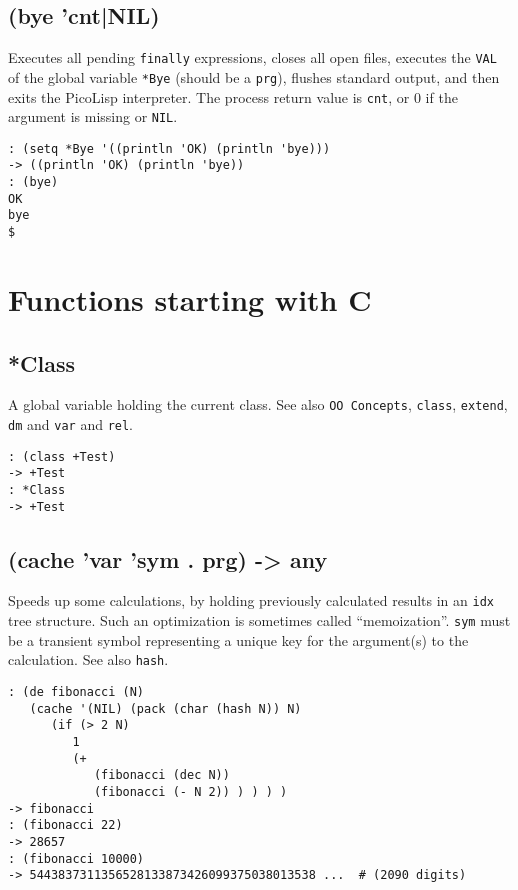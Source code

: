 { 
\section{(bye 'cnt|NIL)}
\label{sec-8-1-2-20}


Executes all pending \texttt{finally} expressions, closes all open files,
executes the \texttt{VAL} of the global variable \texttt{*Bye} (should be a \texttt{prg}),
flushes standard output, and then exits the PicoLisp interpreter. The
process return value is \texttt{cnt}, or 0 if the argument is missing or \texttt{NIL}.


\begin{verbatim}
: (setq *Bye '((println 'OK) (println 'bye)))
-> ((println 'OK) (println 'bye))
: (bye)
OK
bye
$
\end{verbatim}


\chapter{Functions starting with C}
\label{sec-8-1-3}


 
\section{*Class}
\label{sec-8-1-3-1}


A global variable holding the current class. See also \texttt{OO Concepts},
\texttt{class}, \texttt{extend}, \texttt{dm} and \texttt{var} and \texttt{rel}.


\begin{verbatim}
: (class +Test)
-> +Test
: *Class
-> +Test
\end{verbatim}

 
\section{(cache 'var 'sym . prg) -> any}
\label{sec-8-1-3-2}


Speeds up some calculations, by holding previously calculated results in
an \texttt{idx} tree structure. Such an optimization is sometimes called
``memoization''. \texttt{sym} must be a transient symbol representing a unique
key for the argument(s) to the calculation. See also \texttt{hash}.


\begin{verbatim}
: (de fibonacci (N)
   (cache '(NIL) (pack (char (hash N)) N)
      (if (> 2 N)
         1
         (+
            (fibonacci (dec N))
            (fibonacci (- N 2)) ) ) ) )
-> fibonacci
: (fibonacci 22)
-> 28657
: (fibonacci 10000)
-> 5443837311356528133873426099375038013538 ...  # (2090 digits)
\end{verbatim}

}
